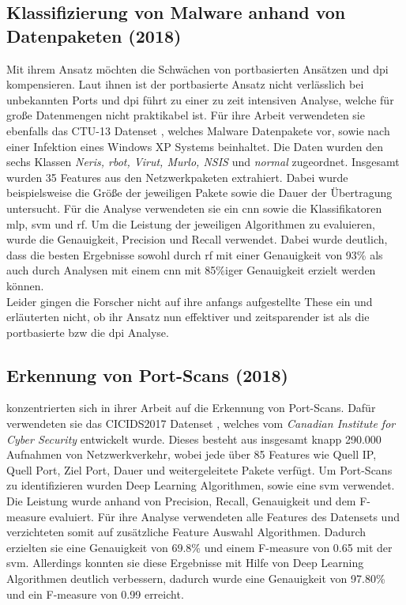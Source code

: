 \documentclass[
    12pt, %
    DIV10,
    ngerman, %
    a4paper, %
    oneside, %
    titlepage, %
    parskip=half, %
    headings=normal, %
    listof=totoc, %
    bibliography=totoc, %
    index=totoc, %
    captions=tableheading, %
    final %
]{scrreprt}
\begin{document}
\subsection{Klassifizierung von Malware anhand von Datenpaketen (2018)}
Mit ihrem Ansatz möchten \textcite{Yeo2018} die Schwächen von portbasierten Ansätzen und \ac{dpi} kompensieren. Laut ihnen ist der portbasierte Ansatz nicht verlässlich bei unbekannten Ports und \ac{dpi} \parencite{dharmapurikar2003deep} führt zu einer zu zeit intensiven Analyse, welche für gro{\ss}e Datenmengen nicht praktikabel ist. Für ihre Arbeit verwendeten sie ebenfalls das CTU-13 Datenset \parencite{garcia2014empirical}, welches Malware Datenpakete vor, sowie nach einer Infektion eines Windows XP Systems beinhaltet. Die Daten wurden den sechs Klassen \emph{Neris, rbot, Virut, Murlo, NSIS} und \emph{normal} zugeordnet. Insgesamt wurden 35 Features aus den Netzwerkpaketen extrahiert. Dabei wurde beispielsweise die Grö{\ss}e der jeweiligen Pakete sowie die Dauer der Übertragung untersucht. Für die Analyse verwendeten sie ein \ac{cnn} sowie die Klassifikatoren \ac{mlp}, \ac{svm} und \ac{rf}. Um die Leistung der jeweiligen Algorithmen zu evaluieren, wurde die Genauigkeit, Precision und Recall verwendet. Dabei wurde deutlich, dass die besten Ergebnisse sowohl durch \ac{rf} mit einer Genauigkeit von 93\% als auch durch Analysen mit einem \ac{cnn} mit 85\%iger Genauigkeit erzielt werden können. \\
Leider gingen die Forscher nicht auf ihre anfangs aufgestellte These ein und erläuterten nicht, ob ihr Ansatz nun effektiver und zeitsparender ist als die portbasierte bzw die \ac{dpi} Analyse.
%
\subsection{Erkennung von Port-Scans (2018)}
\textcite{Aksu2019} konzentrierten sich in ihrer Arbeit auf die Erkennung von Port-Scans. Dafür verwendeten sie das CICIDS2017 Datenset \parencite{Sharafaldin2018}, welches vom \emph{Canadian Institute for Cyber Security} entwickelt wurde. Dieses besteht aus insgesamt knapp 290.000 Aufnahmen von Netzwerkverkehr, wobei jede über 85 Features wie Quell IP, Quell Port, Ziel Port, Dauer und weitergeleitete Pakete verfügt. Um Port-Scans zu identifizieren wurden Deep Learning Algorithmen, sowie eine \ac{svm} verwendet. Die Leistung wurde anhand von Precision, Recall, Genauigkeit und dem F-measure evaluiert. Für ihre Analyse verwendeten  \textcite{Aksu2019} alle Features des Datensets und verzichteten somit auf zusätzliche Feature Auswahl Algorithmen. Dadurch erzielten sie eine Genauigkeit von 69.8\% und einem F-measure von 0.65 mit der \ac{svm}. Allerdings  konnten sie diese Ergebnisse mit Hilfe von Deep Learning Algorithmen deutlich verbessern, dadurch wurde eine Genauigkeit von 97.80\% und ein F-measure von 0.99 erreicht.
%
\end{document}
